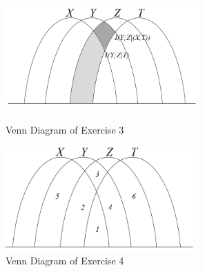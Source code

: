   \begin{figure}[htbp]
    \centering
        \begin{minipage}[t]{0.45\linewidth}
            \centering
            \includegraphics[height=4cm]{img/3-3.png}
            \caption{Venn Diagram of Exercise 3}
            \label{fig:ex3}
        \end{minipage}
        \begin{minipage}[t]{0.45\linewidth}
            \centering
            \includegraphics[height=4cm]{img/3-4.png}
            \caption{Venn Diagram of Exercise 4}
            \label{fig:ex4}
        \end{minipage}
  \end{figure}

